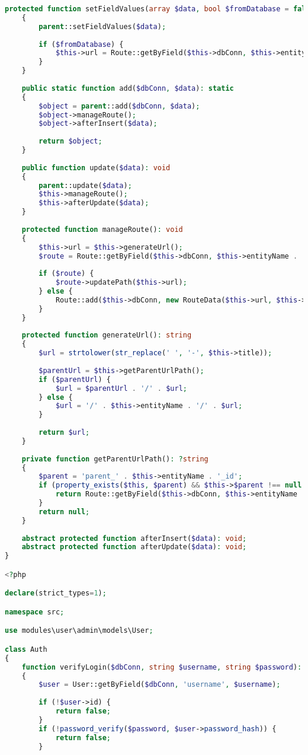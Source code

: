 \begin{lstlisting}[language=PHP, frame=none]
	protected function setFieldValues(array $data, bool $fromDatabase = false): void
	{
		parent::setFieldValues($data);
		
		if ($fromDatabase) {
			$this->url = Route::getByField($this->dbConn, $this->entityName . '_id', $this->id)->path;
		}
	}
	
	public static function add($dbConn, $data): static
	{
		$object = parent::add($dbConn, $data);
		$object->manageRoute();
		$object->afterInsert($data);
		
		return $object;
	}
	
	public function update($data): void
	{
		parent::update($data);
		$this->manageRoute();
		$this->afterUpdate($data);
	}
	
	protected function manageRoute(): void
	{
		$this->url = $this->generateUrl();
		$route = Route::getByField($this->dbConn, $this->entityName . '_id', $this->id);
		
		if ($route) {
			$route->updatePath($this->url);
		} else {
			Route::add($this->dbConn, new RouteData($this->url, $this->controllerName, $this->entityName, $this->id, $this->updateAction));
		}
	}
	
	protected function generateUrl(): string
	{
		$url = strtolower(str_replace(' ', '-', $this->title));
		
		$parentUrl = $this->getParentUrlPath();
		if ($parentUrl) {
			$url = $parentUrl . '/' . $url;
		} else {
			$url = '/' . $this->entityName . '/' . $url;
		}
		
		return $url;
	}
	
	private function getParentUrlPath(): ?string
	{
		$parent = 'parent_' . $this->entityName . '_id';
		if (property_exists($this, $parent) && $this->$parent !== null && $this->$parent != 1) {
			return Route::getByField($this->dbConn, $this->entityName . '_id', $this->$parent)->path;
		}
		return null;
	}
	
	abstract protected function afterInsert($data): void;
	abstract protected function afterUpdate($data): void;
}

<?php

declare(strict_types=1);

namespace src;

use modules\user\admin\models\User;

class Auth
{
	function verifyLogin($dbConn, string $username, string $password): bool
	{
		$user = User::getByField($dbConn, 'username', $username);
		
		if (!$user->id) {
			return false;
		}
		if (!password_verify($password, $user->password_hash)) {
			return false;
		}
		

\end{lstlisting}
